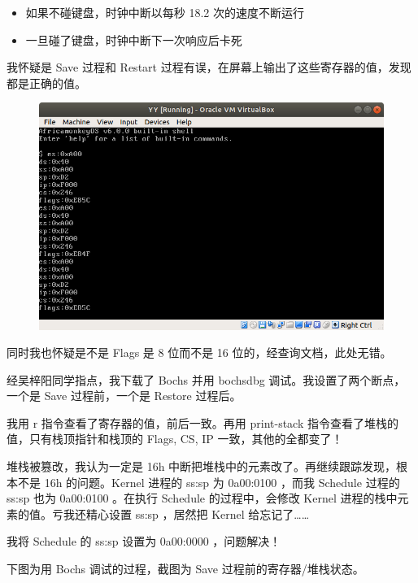 \documentclass{article}
\begin{document}
\begin{itemize}
\item 如果不碰键盘，时钟中断以每秒 18.2 次的速度不断运行
\item 一旦碰了键盘，时钟中断下一次响应后卡死
\end{itemize}

我怀疑是 Save 过程和 Restart 过程有误，在屏幕上输出了这些寄存器的值，发现都是正确的值。

\begin{figure}[!hbp]
	\centering
	\includegraphics[scale=0.55]{pics/1.png}
\end{figure}

同时我也怀疑是不是 Flags 是 8 位而不是 16 位的，经查询文档，此处无错。

经吴梓阳同学指点，我下载了 Bochs 并用 bochsdbg 调试。我设置了两个断点，一个是 Save 过程前，一个是 Restore 过程后。

我用 r 指令查看了寄存器的值，前后一致。再用 print-stack 指令查看了堆栈的值，只有栈顶指针和栈顶的 Flags, CS, IP 一致，其他的全都变了！

堆栈被篡改，我认为一定是 16h 中断把堆栈中的元素改了。再继续跟踪发现，根本不是 16h 的问题。Kernel 进程的 ss:sp 为 0a00:0100 ，而我 Schedule 过程的 ss:sp 也为 0a00:0100 。在执行 Schedule 的过程中，会修改 Kernel 进程的栈中元素的值。亏我还精心设置 ss:sp ，居然把 Kernel 给忘记了……

我将 Schedule 的 ss:sp 设置为 0a00:0000 ，问题解决！

\newpage

下图为用 Bochs 调试的过程，截图为 Save 过程前的寄存器/堆栈状态。
\end{document}

